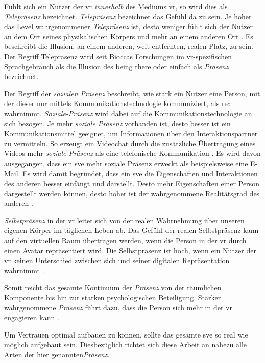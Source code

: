 \documentclass[a4paper,11pt]{article}%
\renewcommand{\\}{\vspace*{0.5\baselineskip} \newline}
\begin{document}
Fühlt sich ein Nutzer der \ac{vr} \textit{innerhalb} des Mediums \ac{vr}, so wird dies als \textit{Telepräsenz} bezeichnet. \textit{Telepräsenz} bezeichnet das Gefühl \glqq{}da zu sein\dq{}. Je höher das Level wahrgenommener \textit{Telepräsenz} ist, desto weniger fühlt sich der Nutzer an dem Ort seines physikalischen Körpers und mehr an einem anderen Ort \citep[S.482]{nowak2003effect}. Es beschreibt die Illusion, an einem anderen, weit entfernten, realen Platz, zu sein. Der Begriff Telepräsenz wird seit Bioccas Forschungen \cite[p.12]{biocca1999cyborg} im \ac{vr}-spezifischen Sprachgebrauch als die Illusion des \glqq{}being there\dq{} oder einfach als \textit{Präsenz} bezeichnet.

Der Begriff der \textit{sozialen Präsenz} beschreibt, wie stark ein Nutzer eine Person, mit der dieser nur mittels Kommunikationstechnologie kommuniziert, als \glqq{}real\dq{} wahrnimmt. \textit{Soziale-Präsenz} wird dabei auf die Kommunikationstechnologie an sich bezogen. Je mehr \textit{soziale Präsenz} vorhanden ist, desto besser ist ein Kommunikationsmittel geeignet, um Informationen über den Interaktionspartner zu vermitteln. So erzeugt ein Videochat durch die zusätzliche Übertragung eines Videos mehr \textit{soziale Präsenz} als eine telefonische Kommunikation \citep[S.151]{gunawardena1995social}.
Es wird davon ausgegangen, dass ein \ac{sve} mehr soziale Präsenz erweckt als beispielsweise eine E-Mail. Es wird damit begründet, dass ein \ac{sve} die Eigenschaften und Interaktionen des anderen besser einfängt und darstellt. Desto mehr Eigenschaften einer Person dargestellt werden können, desto höher ist der wahrgenommene Realitätsgrad des anderen \citep[S. 5-8]{biocca2002defining}.

\textit{Selbstpräsenz} in der \ac{vr} leitet sich von der realen Wahrnehmung über unseren eigenen Körper im täglichen Leben ab. Das Gefühl der realen Selbstpräsenz kann auf den virtuellen Raum übertragen werden, wenn die Person in der \ac{vr} durch einen Avatar repräsentiert wird. Die Selbstpräsenz ist hoch, wenn ein Nutzer der \ac{vr} keinen Unterschied zwischen sich und seiner digitalen Repräsentation wahrnimmt \citep[S.439]{schultze2010embodiment}.

Somit reicht das gesamte Kontinuum der \textit{Präsenz} von der räumlichen Komponente bis hin zur starken psychologischen Beteiligung. Stärker wahrgenommene \textit{Präsenz} führt dazu, dass die Person sich mehr in der \ac{vr} engagieren kann \citep{biocca2001criteria}.

Um Vertrauen optimal aufbauen zu können, sollte das gesamte \ac{sve} so real wie möglich aufgebaut sein. Diesbezüglich richtet sich diese Arbeit an nahezu alle Arten der hier genannten\textit{Präsenz}.
\end{document}
